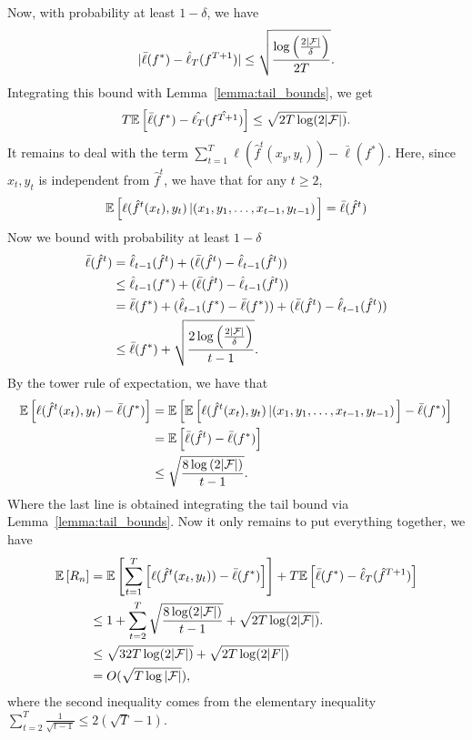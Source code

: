 \begin{solution}[]
Now, with probability at least $ 1- \delta $, we have 
\begin{align*}
	|\bar{\ell}(f^{*}) - \hat{\ell}_T(f^{T+1})| \leq \sqrt{\frac{\log \left( \frac{2 |\mathcal{F}|}{\delta} \right)}{2T}} .
\end{align*}
Integrating this bound with Lemma~\ref{lemma:tail_bounds}, we get 
\begin{equation*}
	T \mathbb{E}\left[\bar{\ell}(f^{*})- \hat{\ell_T}(\hat{f^{T+1}})\right] \leq \sqrt{2T \log (2|\mathcal{F}|)}.
\end{equation*}
It remains to deal with the term $ \sum_{t=1}^{T}\ell(\hat{f}^t(x_y,y_t)) - \bar{\ell}(f^{*}) $. Here, since $ x_t,y_t $
is independent from $ \hat{f}^t $, we have that for any $ t\geq 2 $,
\begin{equation*}
	\mathbb{E}\left[\ell(\hat{f}^t(x_t),y_t)\left|(x_1,y_1,\ldots, x_{t-1},y_{t-1})\right.\right] = \bar{\ell}(\hat{f}^t)
\end{equation*}
Now we bound with probability at least $ 1 - \delta $
\begin{align*}
	\bar{\ell}(\hat{f}^{t}) &= \hat{\ell}_{t-1}(\hat{f}^{t}) + (\bar{\ell}(\hat{f}^{t})- \hat{\ell}_{t-1}(\hat{f}^{t}))\\
				&\leq \hat{\ell}_{t-1}(f^{*}) +(\bar{\ell}(\hat{f}^{t})- \hat{\ell}_{t-1}(\hat{f}^{t}))\\
				&= \bar{\ell}(f^{*}) + (\hat{\ell}_{t-1}(f^{*})- \bar{\ell}(f^{*})) +(\bar{\ell}(\hat{f}^{t})- \hat{\ell}_{t-1}(\hat{f}^{t}))\\
				&\leq \bar{\ell}(f^{*}) + \sqrt{\frac{2\log \left( \frac{2 |\mathcal{F}|}{\delta} \right)}{t-1}}.
\end{align*}
By the tower rule of expectation, we have that
\begin{align*}
	\mathbb{E}\left[\ell(\hat{f}^{t}(x_t),y_t) - \bar{\ell}(f^{*})\right] &= \mathbb{E}\left[\mathbb{E}\left[\ell(\hat{f}^t(x_t),y_t)\left|(x_1,y_1,\ldots,
	x_{t-1},y_{t-1})\right.\right] - \bar{\ell}(f^{*})\right]\\
							    &= \mathbb{E}\left[\bar{\ell}(\hat{f}^{t}) - \bar{\ell}(f^{*})\right]\\
							    &\leq \sqrt{\frac{8\log \left( 2 |\mathcal{F}|
						    \right)}{t-1}}.
\end{align*}
Where the last line is obtained integrating the tail bound via Lemma~\ref{lemma:tail_bounds}.
Now it only remains to put everything together, we have 
\begin{align*}
	\mathbb{E}\left[R_n\right] &= \mathbb{E}\left[\sum_{t=1}^{T}\left[\ell(\hat{f}^t(x_t,y_t)) - \bar{\ell}(f^{*})\right]\right] + T\mathbb{E}\left[\bar{\ell}(f^{*})-
		 \hat{\ell}_T(\hat{f}^{T+1})\right]\\
		 &\leq 1 + \sum_{t=2}^{T} \sqrt{\frac{8 \log (2|\mathcal{F}|)}{t-1}} + \sqrt{2T\log(2|\mathcal{F}|)}.\\
		 &\leq \sqrt{32T\log(2|\mathcal{F}|)} + \sqrt{2T\log(2 |F|)}\\
		 &= O(\sqrt{T\log|\mathcal{F}|}),
\end{align*}
where the second inequality comes from the elementary inequality $ \sum_{t=2}^{T} \frac{1}{\sqrt{t-1}} \leq 2(\sqrt{T}
-1) $.
\end{solution}
